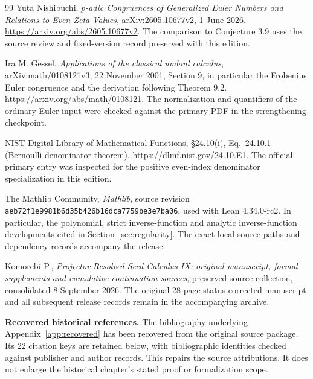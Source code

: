 \documentclass[11pt]{article}
\theoremstyle{definition}
\theoremstyle{remark}
\numberwithin{equation}{section}
\begin{document}
\clearpage
\appendix





\clearpage\def\IXMainAtlas{1}\def\AtlasFigDir{../../figures/worked}\clearpage
\begin{thebibliography}{99}
Yuta Nishibuchi,
\emph{$p$-adic Congruences of Generalized Euler Numbers and Relations to Even
Zeta Values}, arXiv:2605.10677v2, 1 June 2026.
\url{https://arxiv.org/abs/2605.10677v2}.
The comparison to Conjecture 3.9 uses the source review and fixed-version
record preserved with this edition.

Ira M. Gessel, \emph{Applications of the classical umbral calculus},
arXiv:math/0108121v3, 22 November 2001, Section 9, in particular the Frobenius Euler congruence and the derivation following Theorem 9.2.
\url{https://arxiv.org/abs/math/0108121}.
The normalization and quantifiers of the ordinary Euler input were checked against the primary PDF in the strengthening checkpoint.

NIST Digital Library of Mathematical Functions, \S24.10(i),
Eq.\ 24.10.1 (Bernoulli denominator theorem).
\url{https://dlmf.nist.gov/24.10.E1}. The official primary entry was inspected
for the positive even-index denominator specialization in this edition.

The Mathlib Community,
\emph{Mathlib}, source revision
\nolinkurl{aeb72f1e9981b6d35b426b16dca7759be3e7ba06},
used with Lean 4.34.0-rc2.
In particular, the polynomial, strict inverse-function and analytic
inverse-function developments cited in Section~\ref{sec:regularity}.
The exact local source paths and dependency records accompany the release.

Komorebi P.,
\emph{Projector-Resolved Seed Calculus IX: original manuscript, formal
supplements and cumulative continuation sources}, preserved source collection,
consolidated 8 September 2026.
The original 28-page status-corrected manuscript and all subsequent release
records remain in the accompanying archive.

\medskip\noindent\textbf{Recovered historical references.}
The bibliography underlying Appendix~\ref{app:recovered} has been recovered
from the original source package. Its 22 citation keys are retained below,
with bibliographic identities checked against publisher and author records.
This repairs the source attributions. It does not enlarge the historical
chapter's stated proof or formalization scope.

\end{thebibliography}
\end{document}
